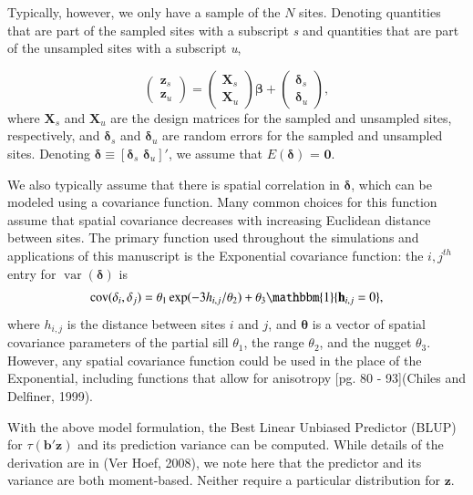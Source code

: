 \documentclass[]{elsarticle} %
\begin{document}
Typically, however, we only have a sample of the \(N\) sites. Denoting
quantities that are part of the sampled sites with a subscript \emph{s}
and quantities that are part of the unsampled sites with a subscript
\emph{u},

\begin{equation}
\begin{pmatrix} \label{equation:Zmarginal}
    \mathbf{z}_s      \\
    \mathbf{z}_u
\end{pmatrix}
=
\begin{pmatrix}
  \mathbf{X}_s    \\
  \mathbf{X}_u
\end{pmatrix}
\bm{\beta} +
\begin{pmatrix}
\bm{\delta}_s    \\
\bm{\delta}_u
\end{pmatrix},
\end{equation} where \(\mathbf{X}_s\) and \(\mathbf{X}_u\) are the
design matrices for the sampled and unsampled sites, respectively, and
\(\bm{\delta}_s\) and \(\bm{\delta}_u\) are random errors for the
sampled and unsampled sites. Denoting
\(\bm{\delta} \equiv [\bm{\delta}_s \,\, \bm{\delta}_u]'\), we assume
that \(E(\bm{\delta})\) = \(\mathbf{0}\).

We also typically assume that there is spatial correlation in
\(\bm{\delta}\), which can be modeled using a covariance function. Many
common choices for this function assume that spatial covariance
decreases with increasing Euclidean distance between sites. The primary
function used throughout the simulations and applications of this
manuscript is the Exponential covariance function: the \(i,j^{th}\)
entry for \(\mathop{\mathrm{{var}}}(\bm{\delta})\) is \mbox{}
\begin{align}\label{equation:expcov}
\mathop{\mathrm{{cov}}}(\delta_i, \delta_j) = \theta_1\exp(-3h_{i,j}/\theta_2) + \theta_3\mathbbm{1}\{\mathbf{h}_{i,j} = 0\}, 
\end{align} where \(h_{i,j}\) is the distance between sites \(i\) and
\(j\), and \(\bm{\theta}\) is a vector of spatial covariance parameters
of the partial sill \(\theta_1\), the range \(\theta_2\), and the nugget
\(\theta_3\). However, any spatial covariance function could be used in
the place of the Exponential, including functions that allow for
anisotropy {[}pg. 80 - 93{]}(Chiles and Delfiner, 1999).

With the above model formulation, the Best Linear Unbiased Predictor
(BLUP) for \(\tau(\mathbf{b}'\mathbf{z})\) and its prediction variance
can be computed. While details of the derivation are in (Ver Hoef,
2008), we note here that the predictor and its variance are both
moment-based. Neither require a particular distribution for
\(\mathbf{z}\).
\end{document}
